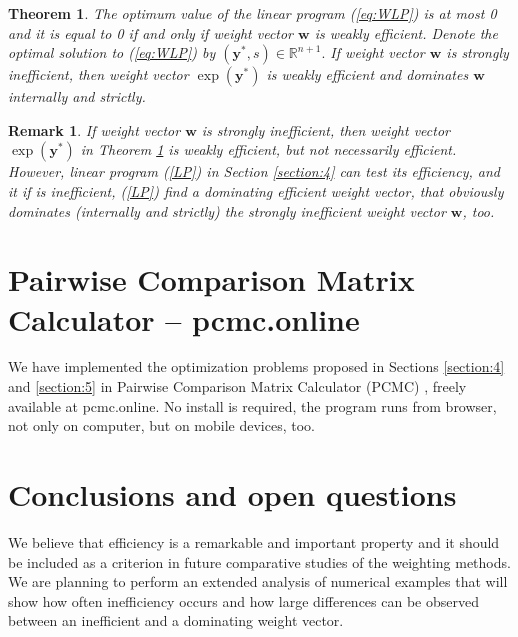 \documentclass{article}
\theoremstyle{plain}
\newtheorem{remark}{Remark}
\newtheorem{theorem}{Theorem}[section]
\begin{document}
\begin{theorem} \label{thm:WLP} %
The optimum value of the linear program (\ref{eq:WLP}) is at most 0
and it is equal to 0 if and only if weight vector $\mathbf{w}$ is weakly ef{\kern0pt}f{\kern0pt}icient.
Denote the optimal solution to (\ref{eq:WLP}) by $(\mathbf{y}^{\ast},s) \in \mathbb{R}^{n+1}.$
If weight vector $\mathbf{w}$ is strongly inef{\kern0pt}f{\kern0pt}icient, then
weight vector $\exp({\mathbf{y}}^{\ast})$ is weakly ef{\kern0pt}f{\kern0pt}icient and dominates $\mathbf{w}$ internally and strictly.
\end{theorem}

\begin{remark}
If weight vector $\mathbf{w}$ is strongly inef{\kern0pt}f{\kern0pt}icient, then
weight vector $\exp({\mathbf{y}}^{\ast})$ in Theorem \ref{thm:WLP} is weakly ef{\kern0pt}f{\kern0pt}icient, but not necessarily
ef{\kern0pt}f{\kern0pt}icient. However, linear program (\ref{LP}) in Section \ref{section:4} can test its ef{\kern0pt}f{\kern0pt}iciency, and it if is inef{\kern0pt}f{\kern0pt}icient,
(\ref{LP}) f{\kern0pt}ind a dominating ef{\kern0pt}f{\kern0pt}icient weight vector, that obviously dominates (internally and strictly)
the strongly inef{\kern0pt}f{\kern0pt}icient weight vector $\mathbf{w}$, too.
\end{remark}


\section{Pairwise Comparison Matrix Calculator -- pcmc.online}
\label{section:6} %
We have implemented the optimization problems proposed in Sections \ref{section:4} and \ref{section:5}
in Pairwise Comparison Matrix Calculator (PCMC) \cite{BozokiFulopNemeth2016}, freely available
at pcmc.online.
No install is required, the program
runs from browser, not only on computer, but on mobile devices, too.


\section{Conclusions and open questions}
\label{section:7} %
We believe that ef{\kern0pt}f{\kern0pt}iciency is a remarkable and important property
and it should be included as a criterion in future comparative studies of the weighting methods.
We are planning to perform an extended analysis of numerical examples that will show how often inef{\kern0pt}f{\kern0pt}iciency occurs and
how large dif{\kern0pt}ferences can be observed between an inef{\kern0pt}f{\kern0pt}icient and a dominating weight vector.
\end{document}

